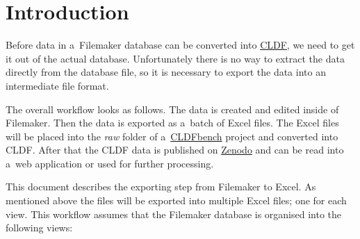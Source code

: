 \documentclass[12pt,a4paper]{scrartcl}
\title{\Title{}}
\date{8 Oct 2020}
\begin{document}
\section{Introduction}%
\label{sec:intro}

Before data in a~Filemaker database can be converted into
\href{https://cldf.clld.org}{CLDF}, we need to get it out of the actual
database.
Unfortunately there is no way to extract the data directly from the database
file, so it is necessary to export the data into an intermediate file format.

The overall workflow looks as follows.
The data is created and edited inside of Filemaker.
Then the data is exported as a~batch of Excel files.
The Excel files will be placed into the \emph{raw} folder of
a~\href{https://github.com/cldf/cldfbench}{CLDFbench}
project and converted into CLDF\@.
After that the CLDF data is published on \href{https://zenodo.org/}{Zenodo} and
can be read into a~web application or used for further processing.

\begin{center}
\end{center}


This document describes the exporting step from Filemaker to Excel.
As mentioned above the files will be exported into multiple Excel files; one for
each view.
This workflow assumes that the Filemaker database is organised into the
following views:
\end{document}
